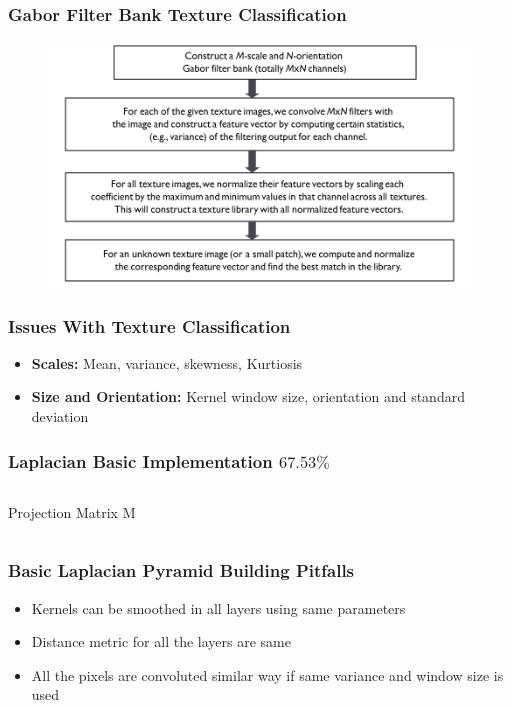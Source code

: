 \documentclass[11pt]{beamer}
\begin{document}
\begin{frame}
\frametitle{Gabor Filter Bank Texture Classification}
\begin{figure}
\includegraphics[width=\textwidth]{gabor-flow.png}
\end{figure}
\end{frame}

\begin{frame}
\frametitle{Issues With Texture Classification}
\begin{itemize}
	\item \textbf{Scales:} Mean, variance, skewness, Kurtiosis
	\item \textbf{Size and Orientation:} Kernel window size, orientation and standard deviation 
\end{itemize}

\end{frame}

\begin{frame}
\frametitle{Laplacian Basic Implementation {$67.53\%$}}
\begin{columns}[T] %
\begin{column}{.8\textwidth}
\begin{table}
	\caption{Projection Matrix M}
\end{table}
\end{column}
\end{columns}
\end{frame}

\begin{frame}
\frametitle{Basic Laplacian Pyramid Building Pitfalls}
\begin{itemize}
	\item Kernels can be smoothed in all layers using same parameters
	\item Distance metric for all the layers are same
	\item All the pixels are convoluted similar way if same variance and window size is used
\end{itemize}
\end{frame}
\end{document}
